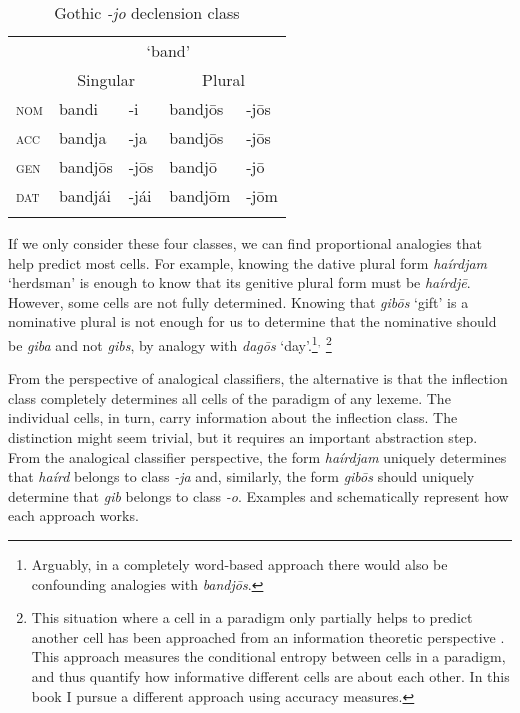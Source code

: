 \begin{table}[t]
  \centering
  \caption{Gothic \textit{-jo} declension class}\label{tab:jo-class-gothic}
  \begin{tabular}{lllll}
    \lsptoprule
        & \multicolumn{4}{c}{`band'}                                \\
        & \multicolumn{2}{c}{Singular} & \multicolumn{2}{c}{Plural} \\
    \midrule
    \textsc{nom} & bandi                        & -i   & bandjōs & -jōs      \\
    \textsc{acc} & bandja                       & -ja  & bandjōs & -jōs      \\
    \textsc{gen} & bandjōs                      & -jōs & bandjō  & -jō       \\
    \textsc{dat} & bandjái                      & -jái & bandjōm & -jōm      \\
    \lspbottomrule
  \end{tabular}
\end{table}

If we only consider these four classes, we can find proportional analogies that help predict most cells. For example, knowing the dative plural form \textit{haírdjam} `herdsman' is enough to know that its genitive plural form must be \textit{haírdjē}. However, some cells are not fully determined. Knowing that \textit{gibōs} `gift' is a nominative plural is not enough for us to determine that the nominative  should be \textit{giba} and not \textit{gibs}, by analogy with \textit{dagōs} `day'.\footnote{Arguably, in a completely word-based approach there would also be confounding analogies with \textit{bandjōs}.}$^{,}$ \footnote{This situation where a cell in a paradigm only partially helps to predict another cell has been approached from an information theoretic perspective \autocite{MoscosodelPradoMartin.2004a, Ackerman.2013a, Blevins.2013, Ackerman.2016, Bonami.2016}. This approach measures the conditional entropy between cells in a paradigm, and thus quantify how informative different cells are about each other. In this book I pursue a different approach using accuracy measures.}

\largerpage[2]
From the perspective of analogical classifiers, the alternative is that the inflection class completely determines all cells of the paradigm of any lexeme. The individual cells, in turn, carry information about the inflection class. The distinction might seem trivial, but it requires an important abstraction step. From the analogical classifier perspective, the form \textit{haírdjam} uniquely determines that \textit{haírd} belongs to class \textit{-ja} and, similarly, the form \textit{gibōs} should uniquely determine that \textit{gib} belongs to class \textit{-o}. Examples  and  schematically represent how each approach works.

